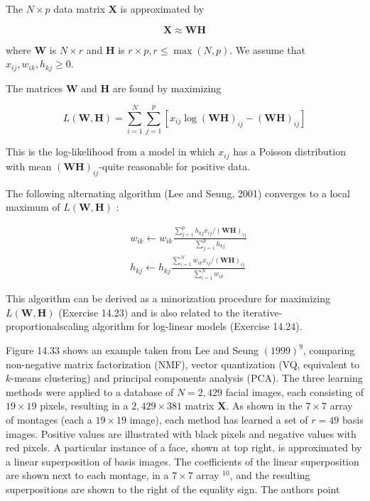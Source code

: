 \documentclass[10pt]{article}
\begin{document}
The $N \times p$ data matrix $\mathbf{X}$ is approximated by


\begin{equation*}
\mathbf{X} \approx \mathbf{W H} \tag{14.72}
\end{equation*}


where $\mathbf{W}$ is $N \times r$ and $\mathbf{H}$ is $r \times p, r \leq \max (N, p)$. We assume that $x_{i j}, w_{i k}, h_{k j} \geq 0$.

The matrices $\mathbf{W}$ and $\mathbf{H}$ are found by maximizing


\begin{equation*}
L(\mathbf{W}, \mathbf{H})=\sum_{i=1}^{N} \sum_{j=1}^{p}\left[x_{i j} \log (\mathbf{W H})_{i j}-(\mathbf{W H})_{i j}\right] \tag{14.73}
\end{equation*}


This is the log-likelihood from a model in which $x_{i j}$ has a Poisson distribution with mean $(\mathbf{W H})_{i j}$-quite reasonable for positive data.

The following alternating algorithm (Lee and Seung, 2001) converges to a local maximum of $L(\mathbf{W}, \mathbf{H})$ :


\begin{align*}
& w_{i k} \leftarrow w_{i k} \frac{\sum_{j=1}^{p} h_{k j} x_{i j} /(\mathbf{W H})_{i j}}{\sum_{j=1}^{p} h_{k j}} \\
& h_{k j} \leftarrow h_{k j} \frac{\sum_{i=1}^{N} w_{i k} x_{i j} /(\mathbf{W H})_{i j}}{\sum_{i=1}^{N} w_{i k}} \tag{14.74}
\end{align*}


This algorithm can be derived as a minorization procedure for maximizing $L(\mathbf{W}, \mathbf{H})$ (Exercise 14.23) and is also related to the iterative-proportionalscaling algorithm for log-linear models (Exercise 14.24).

Figure 14.33 shows an example taken from Lee and Seung $(1999)^{9}$, comparing non-negative matrix factorization (NMF), vector quantization (VQ, equivalent to $k$-means clustering) and principal components analysis (PCA). The three learning methods were applied to a database of $N=2,429$ facial images, each consisting of $19 \times 19$ pixels, resulting in a $2,429 \times 381$ matrix $\mathbf{X}$. As shown in the $7 \times 7$ array of montages (each a $19 \times 19$ image), each method has learned a set of $r=49$ basis images. Positive values are illustrated with black pixels and negative values with red pixels. A particular instance of a face, shown at top right, is approximated by a linear superposition of basis images. The coefficients of the linear superposition are shown next to each montage, in a $7 \times 7$ array ${ }^{10}$, and the resulting superpositions are shown to the right of the equality sign. The authors point
\end{document}
